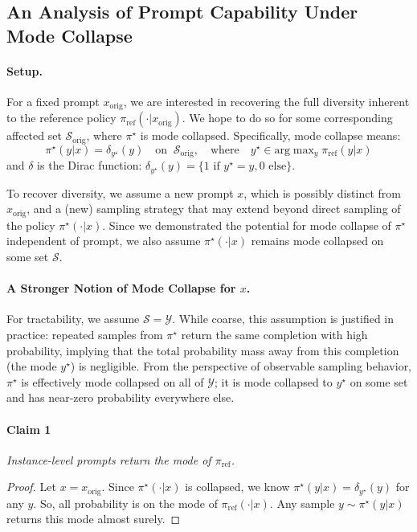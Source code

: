 \subsection{An Analysis of Prompt Capability Under Mode Collapse}
\label{appendix:anthony's proof on the mode for different prompts}
\paragraph{Setup.} For a fixed prompt $x_\text{orig}$, we are interested in recovering the full diversity inherent to the reference policy $\pi_\text{ref}(\cdot | x_\text{orig})$. We hope to do so for some corresponding affected set $\mathcal{S}_{\text{orig}}$, where $\pi^\star$ is mode collapsed. Specifically, mode collapse means:
\begin{equation}
    \pi^\star(y | x) = \delta_{y^\star}(y) \quad\text{on } \ \mathcal{S}_\text{orig}, \quad\text{where}\quad y^\star \in \text{arg}\max\nolimits_y \pi_\text{ref}(y | x)
\end{equation}
and $\delta$ is the Dirac function: $\delta_{y^\star}(y) = \{1 \text{ if }y^\star = y, 0\text{ else}\}.$

To recover diversity, we assume a new prompt $x$, which is possibly distinct from $x_\text{orig}$, and a (new) sampling strategy that may extend beyond direct sampling of the policy $\pi^\star(\cdot | x)$. Since we demonstrated the potential for mode collapse of $\pi^\star$ independent of prompt, we also assume $\pi^\star(\cdot | x)$ remains mode collapsed on some set $\mathcal{S}$.
\paragraph{A Stronger Notion of Mode Collapse for $x$.} For tractability, we assume $\mathcal{S} = \mathcal{Y}$. While coarse, this assumption is justified in practice: repeated samples from $\pi^\star$ return the same completion with high probability, implying that the total probability mass away from this completion (the mode $y^\star$) is negligible. From the perspective of observable sampling behavior, $\pi^\star$ is effectively mode collapsed on all of $\mathcal{Y}$; it is mode collapsed to $y^\star$ on some set and has near-zero probability everywhere else.

\paragraph{Claim 1} \textit{Instance-level prompts return the mode of $\pi_\text{ref}$.} 
\begin{proof}
Let $x = x_\text{orig}$. Since $\pi^\star(\cdot | x)$ is collapsed, we know $\pi^\star(y | x) = \delta_{y^\star}(y)$ for any $y$. So, all probability is on the mode of $\pi_\textrm{ref}(\cdot |x)$. Any sample $y \sim \pi^\star(y | x)$ returns this mode almost surely.
\end{proof}

